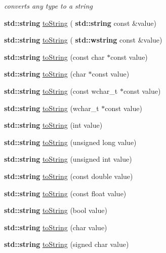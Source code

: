 \begin{DoxyCompactItemize}
\begin{DoxyCompactList}\small\item\em converts any type to a string \end{DoxyCompactList}\item 
\textbf{ std\+::string} \hyperlink{namespace_catch_ad6e969257437cf007b8b5017b22e570c}{to\+String} (\textbf{ std\+::string} const \&value)
\item 
\textbf{ std\+::string} \hyperlink{namespace_catch_af9fc40701e3a7d0790866e7cf8c0279f}{to\+String} (\textbf{ std\+::wstring} const \&value)
\item 
\textbf{ std\+::string} \hyperlink{namespace_catch_ace2e2fe33b196bc8278f605dcb72e38d}{to\+String} (const char $\ast$const value)
\item 
\textbf{ std\+::string} \hyperlink{namespace_catch_ae6c2bc95517444d8df8199bd3f61609b}{to\+String} (char $\ast$const value)
\item 
\textbf{ std\+::string} \hyperlink{namespace_catch_afa173b4639c682c9d8c20fae0939693c}{to\+String} (const wchar\+\_\+t $\ast$const value)
\item 
\textbf{ std\+::string} \hyperlink{namespace_catch_aa39121565abe9f30fce5d48e4e094768}{to\+String} (wchar\+\_\+t $\ast$const value)
\item 
\textbf{ std\+::string} \hyperlink{namespace_catch_acee54d0580385e4347bc42a7d22bc893}{to\+String} (int value)
\item 
\textbf{ std\+::string} \hyperlink{namespace_catch_aba1d78bce62f8c73cbfc2a14225356ea}{to\+String} (unsigned long value)
\item 
\textbf{ std\+::string} \hyperlink{namespace_catch_a6fd78030f740c1c3bdc60efdfd5fc85d}{to\+String} (unsigned int value)
\item 
\textbf{ std\+::string} \hyperlink{namespace_catch_a3eb4356d09b7ef3286f6c1c1efe8cabf}{to\+String} (const double value)
\item 
\textbf{ std\+::string} \hyperlink{namespace_catch_a80b6411e2cba89e58aa8feb960d045d5}{to\+String} (const float value)
\item 
\textbf{ std\+::string} \hyperlink{namespace_catch_a5d3bdb2ec0e6f415e2a1a0e4914d7d3a}{to\+String} (bool value)
\item 
\textbf{ std\+::string} \hyperlink{namespace_catch_a25a0a78cbb62ea08b5d49e443051c387}{to\+String} (char value)
\item 
\textbf{ std\+::string} \hyperlink{namespace_catch_a0a5d9d0965d0d2a0663773732283713e}{to\+String} (signed char value)
\item 

\end{DoxyCompactItemize}
